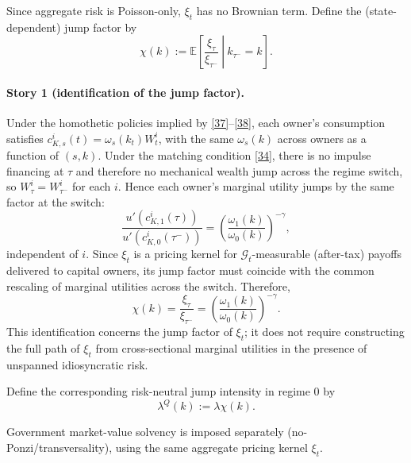 \documentclass{article}
\begin{document}
Since aggregate risk is Poisson-only, $\xi_t$ has no Brownian term. Define the (state-dependent) jump
factor by
\begin{equation}
\chi(k):=\mathbb{E}\!\left[\left.\frac{\xi_\tau}{\xi_{\tau^-}}\ \right|\ k_{\tau^-}=k\right].
\tag{48}
\end{equation}

\paragraph{Story 1 (identification of the jump factor).}
Under the homothetic policies implied by \eqref{37}--\eqref{38}, each owner's consumption satisfies
$c^i_{K,s}(t)=\omega_s(k_t)W^i_t$, with the same $\omega_s(k)$ across owners as a function of $(s,k)$.
Under the matching condition \eqref{34}, there is no impulse financing at $\tau$ and therefore no
mechanical wealth jump across the regime switch, so $W^i_\tau=W^i_{\tau^-}$ for each $i$. Hence each
owner's marginal utility jumps by the same factor at the switch:
\[
\frac{u'(c^i_{K,1}(\tau))}{u'(c^i_{K,0}(\tau^-))}
=
\left(\frac{\omega_1(k)}{\omega_0(k)}\right)^{-\gamma},
\]
independent of $i$. Since $\xi_t$ is a pricing kernel for $\mathcal G_t$-measurable (after-tax) payoffs
delivered to capital owners, its jump factor must coincide with the common rescaling of marginal
utilities across the switch. Therefore,
\[
\chi(k)
=
\frac{\xi_\tau}{\xi_{\tau^-}}
=
\left(\frac{\omega_1(k)}{\omega_0(k)}\right)^{-\gamma}.
\]
This identification concerns the jump factor of $\xi_t$; it does not require constructing the full
path of $\xi_t$ from cross-sectional marginal utilities in the presence of unspanned idiosyncratic
risk.

Define the corresponding risk-neutral jump intensity in regime $0$ by
\begin{equation}
\lambda^Q(k):=\lambda\chi(k).
\tag{49}
\end{equation}

Government market-value solvency is imposed separately (no-Ponzi/transversality), using the same
aggregate pricing kernel $\xi_t$.
\end{document}
